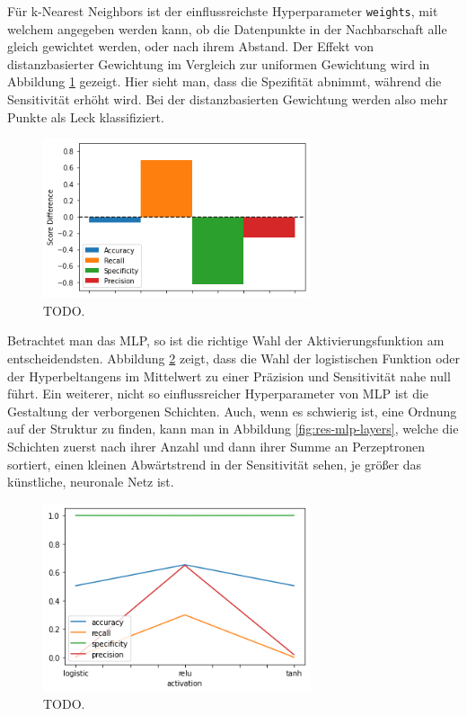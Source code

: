 Für k-Nearest Neighbors ist der einflussreichste Hyperparameter \texttt{weights}, mit welchem angegeben werden
 kann, ob die Datenpunkte in der Nachbarschaft alle gleich gewichtet werden, oder nach ihrem Abstand. Der Effekt
 von distanzbasierter Gewichtung im Vergleich zur uniformen Gewichtung wird in Abbildung
 \ref{fig:res-knn-weights} gezeigt. Hier sieht man, dass die Spezifität abnimmt, während die Sensitivität
 erhöht wird. Bei der distanzbasierten Gewichtung werden also mehr Punkte als Leck klassifiziert.

\begin{figure}
    \centering
    \includegraphics[width=0.7\textwidth]{res/res-knn-weights}
    \caption{TODO.}
    \label{fig:res-knn-weights}
\end{figure}

Betrachtet man das MLP, so ist die richtige Wahl der Aktivierungsfunktion am entscheidendsten. Abbildung
 \ref{fig:res-mlp-activation} zeigt, dass die Wahl der logistischen Funktion oder der Hyperbeltangens im
 Mittelwert zu einer Präzision und Sensitivität nahe null führt. Ein weiterer, nicht so einflussreicher
 Hyperparameter von MLP ist die Gestaltung der verborgenen Schichten. Auch, wenn es schwierig ist, eine Ordnung
 auf der Struktur zu finden, kann man in Abbildung \ref{fig:res-mlp-layers}, welche die Schichten zuerst nach
 ihrer Anzahl und dann ihrer Summe an Perzeptronen sortiert, einen kleinen Abwärtstrend in der Sensitivität
 sehen, je größer das künstliche, neuronale Netz ist.

\begin{figure}
    \centering
    \includegraphics[width=0.7\textwidth]{res/res-mlp-activation}
    \caption{TODO.}
    \label{fig:res-mlp-activation}
\end{figure}

